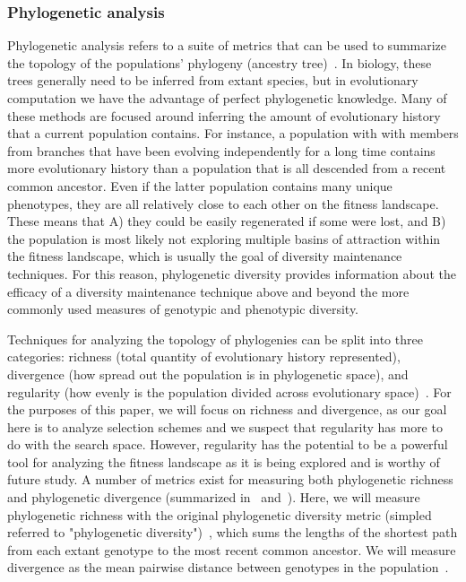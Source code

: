 \subsubsection{Phylogenetic analysis}
Phylogenetic analysis refers to a suite of metrics that can be used to summarize the topology of the populations' phylogeny (ancestry tree)~\cite{winter_phylogenetic_2013}. In biology, these trees generally need to be inferred from extant species, but in evolutionary computation we have the advantage of perfect phylogenetic knowledge. Many of these methods are focused around inferring the amount of evolutionary history that a current population contains. For instance, a population with with members from branches that have been evolving independently for a long time contains more evolutionary history than a population that is all descended from a recent common ancestor. Even if the latter population contains many unique phenotypes, they are all relatively close to each other on the fitness landscape. These means that A) they could be easily regenerated if some were lost, and B) the population is most likely not exploring multiple basins of attraction within the fitness landscape, which is usually the goal of diversity maintenance techniques. For this reason, phylogenetic diversity provides information about the efficacy of a diversity maintenance technique above and beyond the more commonly used measures of genotypic and phenotypic diversity.

Techniques for analyzing the topology of phylogenies can be split into three categories: richness (total quantity of evolutionary history represented), divergence (how spread out the population is in phylogenetic space), and regularity (how evenly is the population divided across evolutionary space)~\cite{tucker_guide_2017}. For the purposes of this paper, we will focus on richness and divergence, as our goal here is to analyze selection schemes and we suspect that regularity has more to do with the search space. However, regularity has the potential to be a powerful tool for analyzing the fitness landscape as it is being explored and is worthy of future study. A number of metrics exist for measuring both phylogenetic richness and phylogenetic divergence (summarized in~\cite{winter_phylogenetic_2013} and~\cite{tucker_guide_2017}). Here, we will measure phylogenetic richness with the original phylogenetic diversity metric (simpled referred to "phylogenetic diversity")~\cite{faith_conservation_1992},  which sums the lengths of the shortest path from each extant genotype to the most recent common ancestor. We will measure divergence as the mean pairwise distance between genotypes in the population~\cite{webb_exploring_2000}.  

